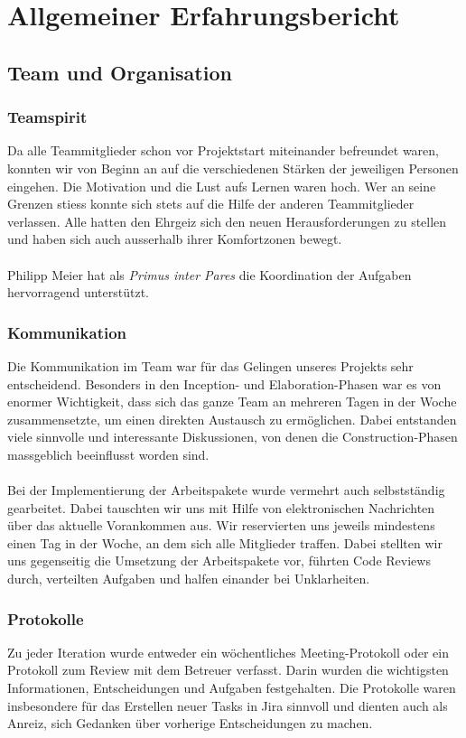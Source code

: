\chapter{Allgemeiner Erfahrungsbericht}
	\section{Team und Organisation}
	
		\subsection{Teamspirit}
		Da alle Teammitglieder schon vor Projektstart miteinander befreundet waren, konnten wir  von Beginn an auf die verschiedenen Stärken der jeweiligen Personen eingehen. Die Motivation und die Lust aufs Lernen waren hoch. Wer an seine Grenzen stiess konnte sich stets auf die Hilfe der anderen Teammitglieder verlassen. Alle hatten den Ehrgeiz sich den neuen Herausforderungen zu stellen und haben sich auch ausserhalb ihrer Komfortzonen bewegt.\\ \\
		Philipp Meier hat als \textit{Primus inter Pares} die Koordination der Aufgaben hervorragend unterstützt. 
		
		\subsection{Kommunikation}
		Die Kommunikation im Team war für das Gelingen unseres Projekts sehr entscheidend. Besonders in den Inception- und Elaboration-Phasen war es von enormer Wichtigkeit, dass sich das ganze Team an mehreren Tagen in der Woche zusammensetzte, um einen direkten Austausch zu ermöglichen. Dabei entstanden viele sinnvolle und interessante Diskussionen, von denen die Construction-Phasen massgeblich beeinflusst worden sind.\\ \\
		Bei der Implementierung der Arbeitspakete wurde vermehrt auch selbstständig gearbeitet. Dabei tauschten wir uns mit Hilfe von elektronischen Nachrichten über das aktuelle Vorankommen aus. Wir reservierten uns jeweils mindestens einen Tag in der Woche, an dem sich alle Mitglieder traffen. Dabei stellten wir uns gegenseitig die Umsetzung der Arbeitspakete vor, führten Code Reviews durch, verteilten Aufgaben und halfen einander bei Unklarheiten.
		
		\subsection{Protokolle}
		Zu jeder Iteration wurde entweder ein wöchentliches Meeting-Protokoll oder ein Protokoll zum Review mit dem Betreuer verfasst. Darin wurden die wichtigsten Informationen, Entscheidungen und Aufgaben festgehalten. Die Protokolle waren insbesondere für das Erstellen neuer Tasks in Jira sinnvoll und dienten auch als Anreiz, sich Gedanken über vorherige Entscheidungen zu machen. 
		
